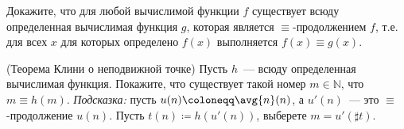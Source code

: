 \begin{enumcyr}
    \item Докажите, что для любой вычислимой функции $f$ существует всюду определенная вычислимая функция
        $g$, которая является $\equiv$-продолжением $f$, т.е. для всех $x$ для которых определено $f(x)$
        выполняется $f(x) \equiv g(x)$.
    \item (Теорема Клини о неподвижной точке) Пусть $h$~--- всюду определенная вычислимая
        функция. Покажите, что существует такой номер $m \in \mathbb{N}$, что $m \equiv h(m)$.
        \textit{Подсказка:} пусть $u(n) \coloneqq \avg{n}(n)$, а $u'(n)$~--- это $\equiv$-продолжение
        $u(n)$. Пусть $t(n) \coloneqq h(u'(n))$, выберете $m = u'(\sharp t)$.
\end{enumcyr}